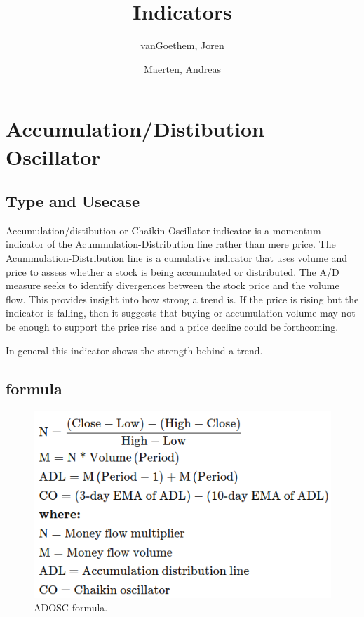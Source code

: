 \documentclass[12pt,a4paper]{article}
\begin{document}
\begin{titlepage}
    \author{
        vanGoethem, Joren
        \and
        Maerten, Andreas
    }
    \title{Indicators}
\end{titlepage}

\maketitle
\newpage
\tableofcontents
\newpage


\section{Accumulation/Distibution Oscillator}

\subsection{Type and Usecase}
Accumulation/distibution or Chaikin Oscillator indicator is a momentum indicator of the Acummulation-Distribution line rather than mere price. The Acummulation-Distribution line is a cumulative indicator that uses volume and price to assess whether a stock is being accumulated or distributed. The A/D measure seeks to identify divergences between the stock price and the volume flow. This provides insight into how strong a trend is. If the price is rising but the indicator is falling, then it suggests that buying or accumulation volume may not be enough to support the price rise and a price decline could be forthcoming.

In general this indicator shows the strength behind a trend.

\subsection{formula}

\begin{figure}[H]
    \includegraphics[scale=0.7]{../images/ADOSC.png}
    \caption{ADOSC formula.}
    \label{fig:ADOSC}
\end{figure}
\end{document}
